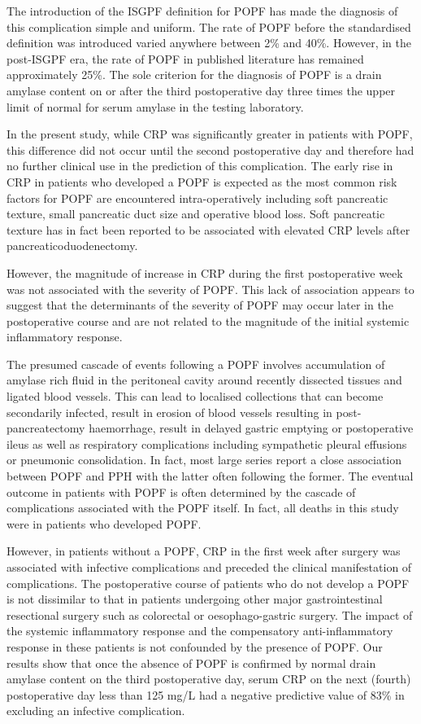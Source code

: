 The introduction of the ISGPF definition for POPF has made the diagnosis of this complication simple and uniform. The rate of POPF before the standardised definition was introduced varied anywhere between 2\% and 40\%. However, in the post-ISGPF era, the rate of POPF in published literature has remained approximately 25\%. The sole criterion for the diagnosis of POPF is a drain amylase content on or after the third postoperative day three times the upper limit of normal for serum amylase in the testing laboratory. 

In the present study, while CRP was significantly greater in patients with POPF, this difference did not occur until the second postoperative day and therefore had no further clinical use in the prediction of this complication. The early rise in CRP in patients who developed a POPF is expected as the most common risk factors for POPF are encountered intra-operatively including soft pancreatic texture, small pancreatic duct size and operative blood loss. Soft pancreatic texture has in fact been reported to be associated with elevated CRP levels after pancreaticoduodenectomy.\parencite{murakami_soft_2008}

However, the magnitude of increase in CRP during the first postoperative week was not associated with the severity of POPF. This lack of association appears to suggest that the determinants of the severity of POPF may occur later in the postoperative course and are not related to the magnitude of the initial systemic inflammatory response.

The presumed cascade of events following a POPF involves accumulation of amylase rich fluid in the peritoneal cavity around recently dissected tissues and ligated blood vessels. This can lead to localised collections that can become secondarily infected, result in erosion of blood vessels resulting in post-pancreatectomy haemorrhage, result in delayed gastric emptying or postoperative ileus as well as respiratory complications including sympathetic pleural effusions or pneumonic consolidation. In fact, most large series report a close association between POPF and PPH with the latter often following the former. The eventual outcome in patients with POPF is often determined by the cascade of complications associated with the POPF itself. In fact, all deaths in this study were in patients who developed POPF.

However, in patients without a POPF, CRP in the first week after surgery was associated with infective complications and preceded the clinical manifestation of complications. The postoperative course of patients who do not develop a POPF is not dissimilar to that in patients undergoing other major gastrointestinal resectional surgery such as colorectal or oesophago-gastric surgery. The impact of the systemic inflammatory response and the compensatory anti-inflammatory response in these patients is not confounded by the presence of POPF. Our results show that once the absence of POPF is confirmed by normal drain amylase content on the third postoperative day, serum CRP on the next (fourth) postoperative day less than 125 mg/L had a negative predictive value of 83\% in excluding an infective complication. 

